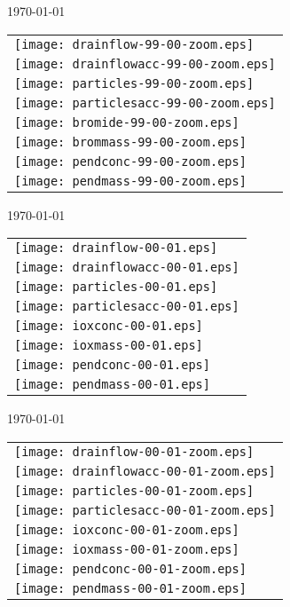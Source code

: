 \documentclass[a4paper]{article}
\begin{document}
\newpage
\today \\
%
\begin{tabular}{l}
\texttt{[image: drainflow-99-00-zoom.eps]} \\
\texttt{[image: drainflowacc-99-00-zoom.eps]} \\
\texttt{[image: particles-99-00-zoom.eps]} \\
\texttt{[image: particlesacc-99-00-zoom.eps]} \\
\texttt{[image: bromide-99-00-zoom.eps]} \\
\texttt{[image: brommass-99-00-zoom.eps]} \\
\texttt{[image: pendconc-99-00-zoom.eps]} \\
\texttt{[image: pendmass-99-00-zoom.eps]}
\end{tabular}

\newpage
\today \\
%
\begin{tabular}{l}
\texttt{[image: drainflow-00-01.eps]} \\
\texttt{[image: drainflowacc-00-01.eps]} \\
\texttt{[image: particles-00-01.eps]} \\
\texttt{[image: particlesacc-00-01.eps]} \\
\texttt{[image: ioxconc-00-01.eps]} \\
\texttt{[image: ioxmass-00-01.eps]} \\
\texttt{[image: pendconc-00-01.eps]} \\
\texttt{[image: pendmass-00-01.eps]}
\end{tabular}

\newpage
\today \\
%
\begin{tabular}{l}
\texttt{[image: drainflow-00-01-zoom.eps]} \\
\texttt{[image: drainflowacc-00-01-zoom.eps]} \\
\texttt{[image: particles-00-01-zoom.eps]} \\
\texttt{[image: particlesacc-00-01-zoom.eps]} \\
\texttt{[image: ioxconc-00-01-zoom.eps]} \\
\texttt{[image: ioxmass-00-01-zoom.eps]} \\
\texttt{[image: pendconc-00-01-zoom.eps]} \\
\texttt{[image: pendmass-00-01-zoom.eps]}
\end{tabular}
\end{document}
